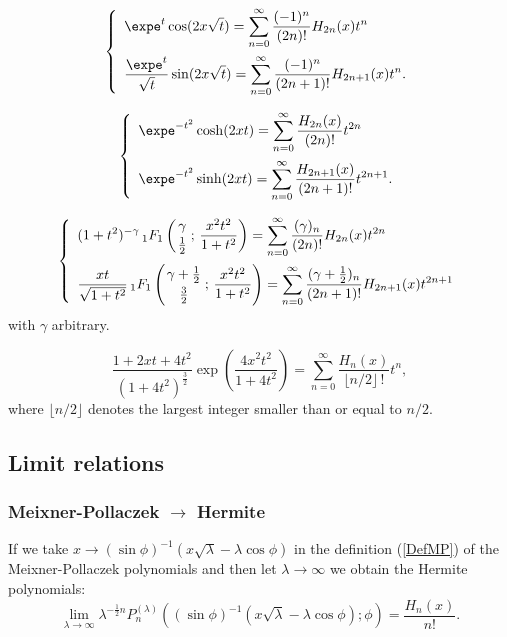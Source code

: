 \documentclass[envcountchap,graybox]{svmono}
\newcommand{\hyp}[5]{\mbox{}_{#1}{F}_{#2}
\left(\genfrac{}{}{0pt}{}{#3}{#4}\,;\,#5\right)}
\newcommand{\hyp}[5]{\,\mbox{}_{#1}F_{#2}\!\left(
  \genfrac{}{}{0pt}{}{#3}{#4};#5\right)}
\begin{document}
\begin{equation}
\label{GenHermite2}
\left\{\begin{array}{l}
\displaystyle\expe^t\cos(2x\sqrt{t})=\sum_{n=0}^{\infty}
\frac{(-1)^n}{(2n)!}H_{2n}(x)t^n\\[5mm]
\displaystyle\frac{\expe^t}{\sqrt{t}}\sin(2x\sqrt{t})=\sum_{n=0}^{\infty}
\frac{(-1)^n}{(2n+1)!}H_{2n+1}(x)t^n.
\end{array}\right.
\end{equation}

\begin{equation}
\label{GenHermite3}
\left\{\begin{array}{l}
\displaystyle \expe^{-t^2}\cosh(2xt)=\sum_{n=0}^{\infty}
\frac{H_{2n}(x)}{(2n)!}t^{2n}\\[5mm]
\displaystyle\expe^{-t^2}\sinh(2xt)=\sum_{n=0}^{\infty}
\frac{H_{2n+1}(x)}{(2n+1)!}t^{2n+1}.
\end{array}\right.
\end{equation}

\begin{equation}
\label{GenHermite4}
\left\{\begin{array}{l}
\displaystyle (1+t^2)^{-\gamma}\,\hyp{1}{1}{\gamma}{\frac{1}{2}}{\frac{x^2t^2}{1+t^2}}=
\sum_{n=0}^{\infty}\frac{(\gamma)_n}{(2n)!}H_{2n}(x)t^{2n}\\[5mm]
\displaystyle\frac{xt}{\sqrt{1+t^2}}\,
\hyp{1}{1}{\gamma+\frac{1}{2}}{\frac{3}{2}}{\frac{x^2t^2}{1+t^2}}
=\sum_{n=0}^{\infty}\frac{(\gamma+\frac{1}{2})_n}{(2n+1)!}H_{2n+1}(x)t^{2n+1}
\end{array}\right.
\end{equation}
with $\gamma$ arbitrary.

\begin{equation}
\label{GenHermite5}
\frac{1+2xt+4t^2}{(1+4t^2)^{\frac{3}{2}}}\exp\left(\frac{4x^2t^2}{1+4t^2}\right)
=\sum_{n=0}^{\infty}\frac{H_n(x)}{\lfloor n/2\rfloor\,!}t^n,
\end{equation}
where $\lfloor n/2\rfloor$ denotes the largest integer smaller than or equal to $n/2$.

\subsection*{Limit relations}

\subsubsection*{Meixner-Pollaczek $\rightarrow$ Hermite}
If we take $x\rightarrow (\sin\phi)^{-1}(x\sqrt{\lambda}-\lambda\cos\phi)$
in the definition (\ref{DefMP}) of the Meixner-Pollaczek polynomials and
then let $\lambda\rightarrow\infty$ we obtain the Hermite polynomials:
$$\lim_{\lambda\rightarrow\infty}
\lambda^{-\frac{1}{2}n}P_n^{(\lambda)}
((\sin\phi)^{-1}(x\sqrt{\lambda}-\lambda\cos\phi);\phi)=\frac{H_n(x)}{n!}.$$
\end{document}
